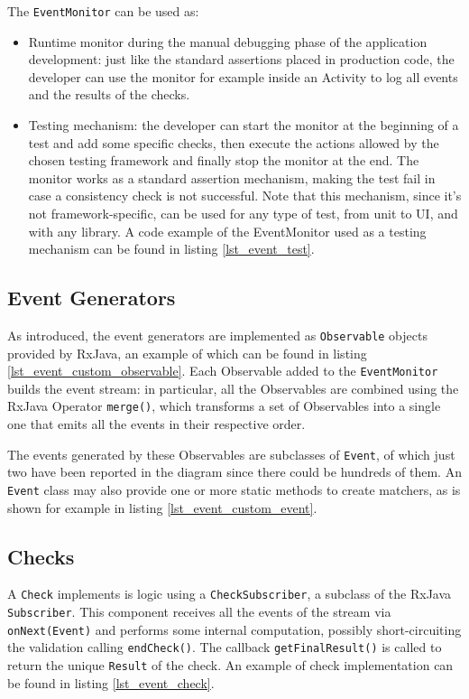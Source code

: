 \documentclass[11pt,a4paper,notitlepage]{article}
\begin{document}
The \texttt{EventMonitor} can be used as:
\begin{itemize}
	\item Runtime monitor during the manual debugging phase of the application development: just like the standard assertions placed in production code, the developer can use the monitor for example inside an Activity to log all events and the results of the checks.
	\item Testing mechanism: the developer can start the monitor at the beginning of a test and add some specific checks, then execute the actions allowed by the chosen testing framework and finally stop the monitor at the end. The monitor works as a standard assertion mechanism, making the test fail in case a consistency check is not successful. Note that this mechanism, since it's not framework-specific, can be used for any type of test, from unit to UI, and with any library. A code example of the EventMonitor used as a testing mechanism can be found in listing \ref{lst_event_test}.
\end{itemize}

\subsection{Event Generators}
As introduced, the event generators are implemented as \texttt{Observable} objects provided by RxJava, an example of which can be found in listing \ref{lst_event_custom_observable}. Each Observable added to the \texttt{EventMonitor} builds the event stream: in particular, all the Observables are combined using the RxJava Operator \texttt{merge()}, which transforms a set of Observables into a single one that emits all the events in their respective order.

The events generated by these Observables are subclasses of \texttt{Event}, of which just two have been reported in the diagram since there could be hundreds of them. An \texttt{Event} class may also provide one or more static methods to create matchers, as is shown for example in listing \ref{lst_event_custom_event}.

\subsection{Checks}
A \texttt{Check} implements is logic using a \texttt{CheckSubscriber}, a subclass of the RxJava \texttt{Subscriber}. This component receives all the events of the stream via \texttt{onNext(Event)} and performs some internal computation, possibly short-circuiting the validation calling \texttt{endCheck()}. The callback \texttt{getFinalResult()} is called to return the unique \texttt{Result} of the check. An example of check implementation can be found in listing \ref{lst_event_check}.
\end{document}
